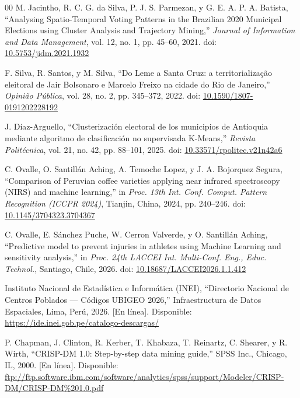 \documentclass[conference,10pt,letterpaper]{IEEEtran}
\begin{document}
\begin{thebibliography}{00}
 M. Jacintho, R. C. G. da Silva, P. J. S. Parmezan, y G. E. A. P. A. Batista, ``Analysing Spatio-Temporal Voting Patterns in the Brazilian 2020 Municipal Elections using Cluster Analysis and Trajectory Mining,'' \textit{Journal of Information and Data Management}, vol. 12, no. 1, pp. 45--60, 2021. doi: \href{https://doi.org/10.5753/jidm.2021.1932}{10.5753/jidm.2021.1932}

 F. Silva, R. Santos, y M. Silva, ``Do Leme a Santa Cruz: a territorialização eleitoral de Jair Bolsonaro e Marcelo Freixo na cidade do Rio de Janeiro,'' \textit{Opinião Pública}, vol. 28, no. 2, pp. 345--372, 2022. doi: \href{https://doi.org/10.1590/1807-0191202228192}{10.1590/1807-0191202228192}

 J. Díaz-Arguello, ``Clusterización electoral de los municipios de Antioquia mediante algoritmo de clasificación no supervisada K-Means,'' \textit{Revista Politécnica}, vol. 21, no. 42, pp. 88--101, 2025. doi: \href{https://doi.org/10.33571/rpolitec.v21n42a6}{10.33571/rpolitec.v21n42a6}

 C. Ovalle, O. Santillán Aching, A. Temoche Lopez, y J. A. Bojorquez Segura, ``Comparison of Peruvian coffee varieties applying near infrared spectroscopy (NIRS) and machine learning,'' in \textit{Proc. 13th Int. Conf. Comput. Pattern Recognition (ICCPR 2024)}, Tianjin, China, 2024, pp. 240--246. doi: \href{https://doi.org/10.1145/3704323.3704367}{10.1145/3704323.3704367}

 C. Ovalle, E. Sánchez Puche, W. Cerron Valverde, y O. Santillán Aching, ``Predictive model to prevent injuries in athletes using Machine Learning and sensitivity analysis,'' in \textit{Proc. 24th LACCEI Int. Multi-Conf. Eng., Educ. Technol.}, Santiago, Chile, 2026. doi: \href{https://doi.org/10.18687/LACCEI2026.1.1.412}{10.18687/LACCEI2026.1.1.412}

 Instituto Nacional de Estadística e Informática (INEI), ``Directorio Nacional de Centros Poblados --- Códigos UBIGEO 2026,'' Infraestructura de Datos Espaciales, Lima, Perú, 2026. [En línea]. Disponible: \url{https://ide.inei.gob.pe/catalogo-descargas/}

 P. Chapman, J. Clinton, R. Kerber, T. Khabaza, T. Reinartz, C. Shearer, y R. Wirth, ``CRISP-DM 1.0: Step-by-step data mining guide,'' SPSS Inc., Chicago, IL, 2000. [En línea]. Disponible: \url{ftp://ftp.software.ibm.com/software/analytics/spss/support/Modeler/CRISP-DM/CRISP-DM\%201.0.pdf}


\end{thebibliography}
\end{document}
